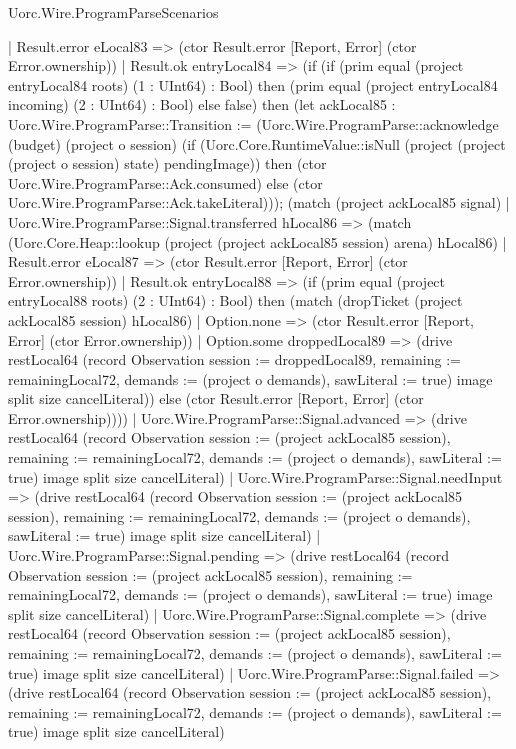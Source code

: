 \begin{lexlean}{Uorc.Wire.ProgramParseScenarios}
\begin{semanticmodule}
{              | Result.error eLocal83 => (ctor Result.error [Report, Error] (ctor Error.ownership))
              | Result.ok entryLocal84 => (if (if (prim equal (project entryLocal84 roots) (1 : UInt64) : Bool) then (prim equal (project entryLocal84 incoming) (2 : UInt64) : Bool) else false) then (let ackLocal85 : Uorc.Wire.ProgramParse::Transition := (Uorc.Wire.ProgramParse::acknowledge (budget) (project o session) (if (Uorc.Core.RuntimeValue::isNull (project (project (project o session) state) pendingImage)) then (ctor Uorc.Wire.ProgramParse::Ack.consumed) else (ctor Uorc.Wire.ProgramParse::Ack.takeLiteral))); (match (project ackLocal85 signal)
                | Uorc.Wire.ProgramParse::Signal.transferred hLocal86 => (match (Uorc.Core.Heap::lookup (project (project ackLocal85 session) arena) hLocal86)
                  | Result.error eLocal87 => (ctor Result.error [Report, Error] (ctor Error.ownership))
                  | Result.ok entryLocal88 => (if (prim equal (project entryLocal88 roots) (2 : UInt64) : Bool) then (match (dropTicket (project ackLocal85 session) hLocal86)
                    | Option.none => (ctor Result.error [Report, Error] (ctor Error.ownership))
                    | Option.some droppedLocal89 => (drive restLocal64 (record Observation {session := droppedLocal89, remaining := remainingLocal72, demands := (project o demands), sawLiteral := true}) image split size cancelLiteral)) else (ctor Result.error [Report, Error] (ctor Error.ownership))))
                | Uorc.Wire.ProgramParse::Signal.advanced => (drive restLocal64 (record Observation {session := (project ackLocal85 session), remaining := remainingLocal72, demands := (project o demands), sawLiteral := true}) image split size cancelLiteral)
                | Uorc.Wire.ProgramParse::Signal.needInput => (drive restLocal64 (record Observation {session := (project ackLocal85 session), remaining := remainingLocal72, demands := (project o demands), sawLiteral := true}) image split size cancelLiteral)
                | Uorc.Wire.ProgramParse::Signal.pending => (drive restLocal64 (record Observation {session := (project ackLocal85 session), remaining := remainingLocal72, demands := (project o demands), sawLiteral := true}) image split size cancelLiteral)
                | Uorc.Wire.ProgramParse::Signal.complete => (drive restLocal64 (record Observation {session := (project ackLocal85 session), remaining := remainingLocal72, demands := (project o demands), sawLiteral := true}) image split size cancelLiteral)
                | Uorc.Wire.ProgramParse::Signal.failed => (drive restLocal64 (record Observation {session := (project ackLocal85 session), remaining := remainingLocal72, demands := (project o demands), sawLiteral := true}) image split size cancelLiteral)
}
\end{semanticmodule}
\end{lexlean}
